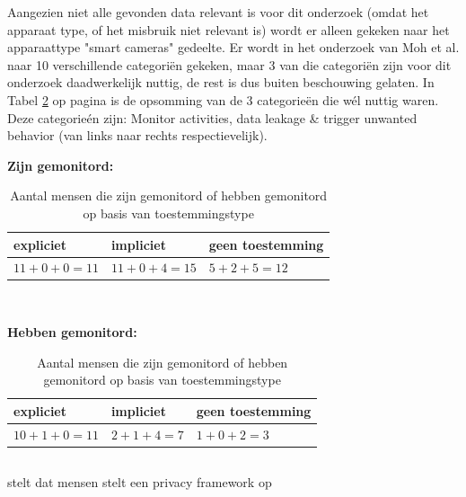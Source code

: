 \documentclass[nonacm,sigconf]{acmart}
\begin{document}
    Aangezien niet alle gevonden data relevant is voor dit onderzoek (omdat het apparaat type, of het misbruik niet relevant is) wordt er alleen gekeken naar het apparaattype "smart cameras" gedeelte.
    Er wordt in het onderzoek van Moh et al. naar 10 verschillende categoriën gekeken, maar 3 van die categoriën zijn voor dit onderzoek daadwerkelijk nuttig, de rest is dus buiten beschouwing gelaten.
    In Tabel \ref{table:moh} op pagina \pageref{table:moh} is de opsomming van de 3 categorieën die wél nuttig waren.
    Deze categorieén zijn: Monitor activities, data leakage & trigger unwanted behavior (van links naar rechts respectievelijk).

    \begin{table}[h]
        \raggedright\textbf{Zijn gemonitord:}
        \begin{tabularx}{\columnwidth}{|X|X|X|}
            \hline
            expliciet & impliciet & geen toestemming\\
            \hline
            $11+0+0 = 11$ & $11+0+4 = 15$ & $5+2+5 = 12$\\
            \hline
        \end{tabularx}
        \vspace{0.01cm}
        \\
        \raggedright\textbf{Hebben gemonitord:}
        \begin{tabularx}{\columnwidth}{|X|X|X|}
            \hline
            expliciet & impliciet & geen toestemming\\
            \hline
            $10+1+0 = 11$ & $2+1+4 = 7$ & $1+0+2 = 3$\\
            \hline
        \end{tabularx}
        \caption{Aantal mensen die zijn gemonitord of hebben gemonitord op basis van toestemmingstype \parencite{moh2023characterizing}}
       \label{table:moh}
    \end{table}

    \subsection{}
    \parencite{van2016privacy} stelt dat mensen stelt een privacy framework op

\end{document}
